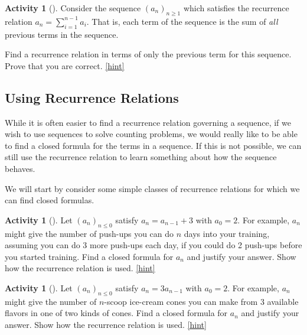 \documentclass[10pt,]{book}
\theoremstyle{plain}
\theoremstyle{definition}
\theoremstyle{definition}
\theoremstyle{definition}
\newtheorem{activity}[project]{Activity}
\numberwithin{equation}{chapter}
\begin{document}
\begin{activity}[]\label{activity-135}
\hypertarget{p-917}{}%
Consider the sequence \((a_n)_{n \ge 1}\) which satisfies the recurrence relation \(a_n = \sum_{i = 1}^{n-1} a_i\).  That is, each term of the sequence is the sum of \emph{all} previous terms in the sequence.%
\par
\hypertarget{p-918}{}%
Find a recurrence relation in terms of only the previous term for this sequence.  Prove that you are correct.%
\hfill{\tiny\hyperlink{a-142}{[hint]}\hypertarget{q-142}{}}\end{activity}
\typeout{************************************************}
\typeout{************************************************}
\subsection[{Using Recurrence Relations}]{Using Recurrence Relations}\label{subsec-recursionclosed}
\hypertarget{p-920}{}%
While it is often easier to find a recurrence relation governing a sequence, if we wish to use sequences to solve counting problems, we would really like to be able to find a closed formula for the terms in a sequence. If this is not possible, we can still use the recurrence relation to learn something about how the sequence behaves.%
\par
\hypertarget{p-921}{}%
We will start by consider some simple classes of recurrence relations for which we can find closed formulas.%
\begin{activity}[]\label{act-arithmetic}
\hypertarget{p-922}{}%
Let \((a_n)_{n \le 0}\) satisfy \(a_n = a_{n-1} + 3\) with \(a_0 = 2\).  For example, \(a_n\) might give the number of push-ups you can do \(n\) days into your training, assuming you can do 3 more push-ups each day, if you could do 2 push-ups before you started training.  Find a closed formula for \(a_n\) and justify your answer.  Show how the recurrence relation is used.%
\hfill{\tiny\hyperlink{a-143}{[hint]}\hypertarget{q-143}{}}\end{activity}
\begin{activity}[]\label{act-geometric}
\hypertarget{p-924}{}%
Let \((a_n)_{n \le 0}\) satisfy \(a_n = 3a_{n-1}\) with \(a_0 = 2\).  For example, \(a_n\) might give the number of \(n\)-scoop ice-cream cones you can make from 3 available flavors in one of two kinds of cones.  Find a closed formula for \(a_n\) and justify your answer.  Show how the recurrence relation is used.%
\hfill{\tiny\hyperlink{a-144}{[hint]}\hypertarget{q-144}{}}\end{activity}
\end{document}
